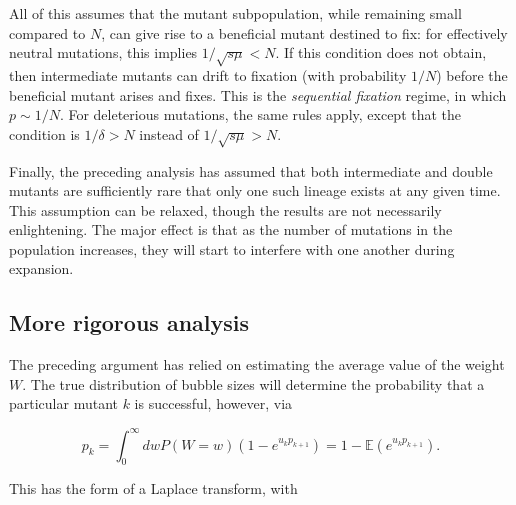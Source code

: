 \documentclass[10pt]{revtex4}
\begin{document}
All of this assumes that the mutant subpopulation, while remaining small compared to $N$, can give rise to a beneficial mutant destined to fix: for effectively neutral mutations, this implies $1/\sqrt{s\mu} < N$.
If this condition does not obtain, then intermediate mutants can drift to fixation (with probability $1/N$) before the beneficial mutant arises and fixes.
This is the \emph{sequential fixation} regime, in which $p \sim 1/N$.
For deleterious mutations, the same rules apply, except that the condition is $1/\delta > N$ instead of $1/\sqrt{s\mu} > N$.

Finally, the preceding analysis has assumed that both intermediate and double mutants are sufficiently rare that only one such lineage exists at any given time. This assumption can be relaxed, though the results are not necessarily enlightening. The major effect is that as the number of mutations in the population increases, they will start to interfere with one another during expansion.

\subsection{More rigorous analysis}

The preceding argument has relied on estimating the average value of the weight $W$.
The true distribution of bubble sizes will determine the probability that a particular mutant $k$ is successful, however, via

\begin{equation}
p_k = \int_0^\infty dw P(W = w) (1-e^{u_k p_{k+1}}) = 1-\mathbb{E}(e^{u_k p_{k+1}}).
\end{equation}

This has the form of a Laplace transform, with
\end{document}
